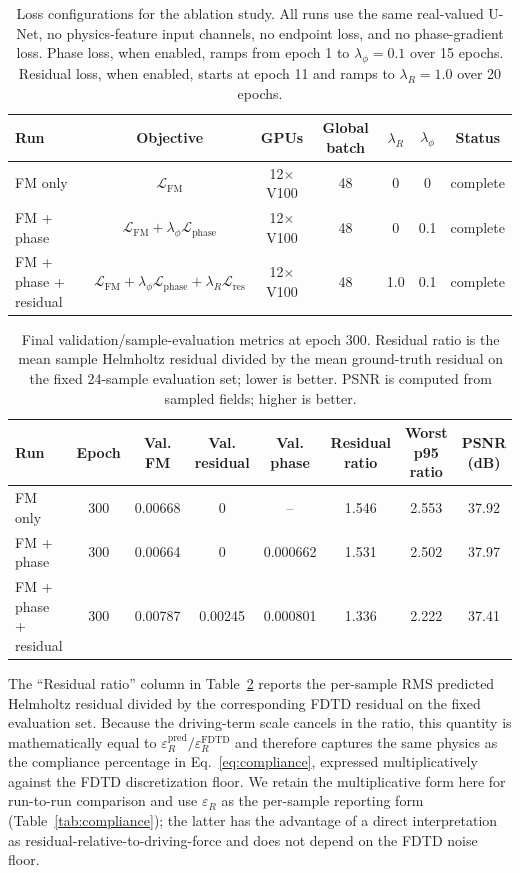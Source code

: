 \documentclass[%
 reprint,
 amsmath,amssymb,
 aps,
floatfix,
]{revtex4-2}
\begin{document}
\begin{table}[!tbp]
\centering
\caption{Loss configurations for the ablation study. All runs use the same real-valued U-Net, no physics-feature input channels, no endpoint loss, and no phase-gradient loss. Phase loss, when enabled, ramps from epoch 1 to $\lambda_\phi=0.1$ over 15 epochs. Residual loss, when enabled, starts at epoch 11 and ramps to $\lambda_R=1.0$ over 20 epochs.}
\label{tab:ablation_design}
\small
\setlength{\tabcolsep}{5pt}
\begin{tabular}{lcccccc}
\hline\hline
Run & Objective & GPUs & Global batch & $\lambda_R$ & $\lambda_\phi$ & Status \\
\hline
FM only & $\mathcal{L}_\mathrm{FM}$ & 12$\times$V100 & 48 & 0 & 0 & complete \\
FM + phase & $\mathcal{L}_\mathrm{FM}+\lambda_\phi\mathcal{L}_\mathrm{phase}$ & 12$\times$V100 & 48 & 0 & 0.1 & complete \\
FM + phase + residual & $\mathcal{L}_\mathrm{FM}+\lambda_\phi\mathcal{L}_\mathrm{phase}+\lambda_R\mathcal{L}_\mathrm{res}$ & 12$\times$V100 & 48 & 1.0 & 0.1 & complete \\
\hline\hline
\end{tabular}
\end{table}

\begin{table}[!tbp]
\centering
\caption{Final validation/sample-evaluation metrics at epoch 300. Residual ratio is the mean sample Helmholtz residual divided by the mean ground-truth residual on the fixed 24-sample evaluation set; lower is better. PSNR is computed from sampled fields; higher is better.}
\label{tab:ablation_final_metrics}
\footnotesize
\setlength{\tabcolsep}{5pt}
\begin{tabular}{lccccccc}
\hline\hline
Run & Epoch & Val. FM & Val. residual & Val. phase & Residual ratio & Worst p95 ratio & PSNR (dB) \\
\hline
FM only & 300 & 0.00668 & 0 & -- & 1.546 & 2.553 & 37.92 \\
FM + phase & 300 & 0.00664 & 0 & 0.000662 & 1.531 & 2.502 & 37.97 \\
FM + phase + residual & 300 & 0.00787 & 0.00245 & 0.000801 & 1.336 & 2.222 & 37.41 \\
\hline\hline
\end{tabular}
\end{table}

The ``Residual ratio'' column in Table~\ref{tab:ablation_final_metrics} reports the per-sample RMS predicted Helmholtz residual divided by the corresponding FDTD residual on the fixed evaluation set. Because the driving-term scale cancels in the ratio, this quantity is mathematically equal to $\varepsilon_R^\mathrm{pred}/\varepsilon_R^\mathrm{FDTD}$ and therefore captures the same physics as the compliance percentage in Eq.~\eqref{eq:compliance}, expressed multiplicatively against the FDTD discretization floor. We retain the multiplicative form here for run-to-run comparison and use $\varepsilon_R$ as the per-sample reporting form (Table~\ref{tab:compliance}); the latter has the advantage of a direct interpretation as residual-relative-to-driving-force and does not depend on the FDTD noise floor.
\end{document}
